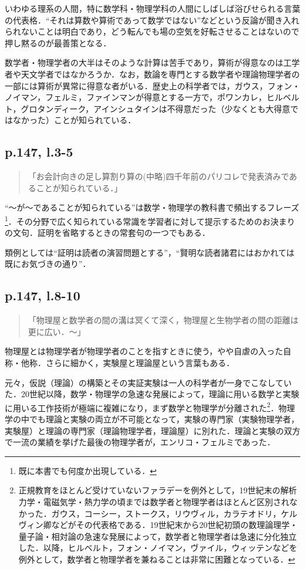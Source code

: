 \documentclass[10pt, a5paper, twoside]{ltjsarticle}
\begin{document}
            いわゆる理系の人間，特に数学科・物理学科の人間にしばしば浴びせられる言葉の代表格．“それは算数や算術であって数学ではない”などという反論が聞き入れられないことは明白であり，どう転んでも場の空気を好転させることはないので押し黙るのが最善策となる．

            数学者・物理学者の大半はそのような計算は苦手であり，算術が得意なのは工学者や天文学者ではなかろうか．なお，数論を専門とする数学者や理論物理学者の一部には算術が異常に得意な者がいる．歴史上の科学者では，ガウス，フォン・ノイマン，フェルミ，ファインマンが得意とする一方で，ポワンカレ，ヒルベルト，グロタンディーク，アインシュタインは不得意だった（少なくとも大得意ではなかった）ことが知られている．

        \subsection{p.147, l.3-5}

            \begin{quote}
                「お会計向きの足し算割り算の(中略)四千年前のパリコレで発表済みであることが知られている．」
            \end{quote}

            “〜が〜であることが知られている”は数学・物理学の教科書で頻出するフレーズ\footnote{既に本書でも何度か出現している．}．その分野で広く知られている常識を学習者に対して提示するためのお決まりの文句．証明を省略するときの常套句の一つでもある．

            類例としては“証明は読者の演習問題とする”，“賢明な読者諸君にはおかれては既にお気づきの通り”．

        \subsection{p.147, l.8-10}

            \begin{quote}
                「物理屋と数学者の間の溝は冥くて深く，物理屋と生物学者の間の距離は更に広い．〜」
            \end{quote}

            物理屋とは物理学者が物理学者のことを指すときに使う，やや自虐の入った自称・他称．さらに細かく，実験屋と理論屋という言葉もある．

            元々，仮説（理論）の構築とその実証実験は一人の科学者が一身でこなしていた．20世紀以降，数学・物理学の急速な発展によって，理論に用いる数学と実験に用いる工作技術が極端に複雑になり，まず数学と物理学が分離された\footnote{正規教育をほとんど受けていないファラデーを例外として，19世紀末の解析力学・電磁気学・熱力学の頃までは数学者と物理学者はほとんど区別されなかった．ガウス，コーシー，ストークス，リウヴィル，カラテオドリ，ケルヴィン卿などがその代表格である．19世紀末から20世紀初頭の数理論理学・量子論・相対論の急速な発展によって，数学者と物理学者は急速に分化独立した．以降，ヒルベルト，フォン・ノイマン，ヴァイル，ウィッテンなどを例外として，数学者と物理学者を兼ねることは非常に困難となっている．}．物理学の中でも理論と実験の両立が不可能となって，実験の専門家（実験物理学者，実験屋）と理論の専門家（理論物理学者，理論屋）に別れた．理論と実験の双方で一流の業績を挙げた最後の物理学者が，エンリコ・フェルミであった．
\end{document}
